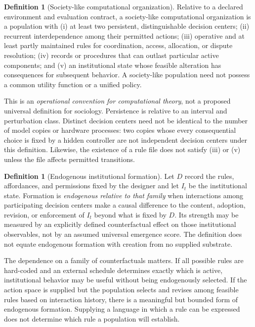 \documentclass[11pt,letterpaper]{article}
\theoremstyle{plain}
\theoremstyle{definition}
\newtheorem{definition}[proposition]{Definition}
\theoremstyle{remark}
\begin{document}
\begin{definition}[Society-like computational organization]\label{def:society}
Relative to a declared environment and evaluation contract, a society-like computational organization is a population with (i) at least two persistent, distinguishable decision centers; (ii) recurrent interdependence among their permitted actions; (iii) operative and at least partly maintained rules for coordination, access, allocation, or dispute resolution; (iv) records or procedures that can outlast particular active components; and (v) an institutional state whose feasible alteration has consequences for subsequent behavior. A society-like population need not possess a common utility function or a unified policy.
\end{definition}

This is an \emph{operational convention for computational theory}, not a proposed universal definition for sociology. Persistence is relative to an interval and perturbation class. Distinct decision centers need not be identical to the number of model copies or hardware processes: two copies whose every consequential choice is fixed by a hidden controller are not independent decision centers under this definition. Likewise, the existence of a rule file does not satisfy (iii) or (v) unless the file affects permitted transitions.

\begin{definition}[Endogenous institutional formation]\label{def:endogenous}
Let $D$ record the rules, affordances, and permissions fixed by the designer and let $I_t$ be the institutional state. Formation is \emph{endogenous relative to that family} when interactions among participating decision centers make a causal difference to the content, adoption, revision, or enforcement of $I_t$ beyond what is fixed by $D$. Its strength may be measured by an explicitly defined counterfactual effect on those institutional observables, not by an assumed universal emergence score. The definition does not equate endogenous formation with creation from no supplied substrate.
\end{definition}

The dependence on a family of counterfactuals matters. If all possible rules are hard-coded and an external schedule determines exactly which is active, institutional behavior may be useful without being endogenously selected. If the action space is supplied but the population selects and revises among feasible rules based on interaction history, there is a meaningful but bounded form of endogenous formation. Supplying a language in which a rule can be expressed does not determine which rule a population will establish.
\end{document}
